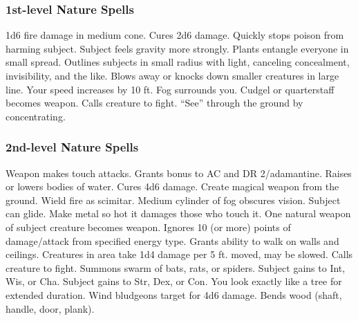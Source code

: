 \subsubsection{1st-level Nature Spells}
\begin{spelllist}
   1d6 fire damage in medium cone.
   Cures 2d6 damage.
   Quickly stops poison from harming subject.
   Subject feels gravity more strongly.
   Plants entangle everyone in small spread.
   Outlines subjects in small radius with light, canceling concealment, invisibility, and the like.
   Blows away or knocks down smaller creatures in large line.
   Your speed increases by 10 ft.
   Fog surrounds you.
   Cudgel or quarterstaff becomes  weapon.
   Calls creature to fight.
   ``See'' through the ground by concentrating.
\end{spelllist}

\subsubsection{2nd-level Nature Spells}
\begin{spelllist}
   Weapon makes touch attacks. 
   Grants  bonus to AC and DR 2/adamantine.
   Raises or lowers bodies of water.
   Cures 4d6 damage.
   Create magical weapon from the ground.
   Wield fire as scimitar.
   Medium cylinder of fog obscures vision.
   Subject can glide.
   Make metal so hot it damages those who touch it.
   One natural weapon of subject creature becomes  weapon.
   Ignores 10 (or more) points of damage/attack from specified energy type.
   Grants ability to walk on walls and ceilings.
   Creatures in area take 1d4 damage per 5 ft. moved, may be slowed.
   Calls creature to fight.
   Summons swarm of bats, rats, or spiders.
   Subject gains  to Int, Wis, or Cha.
   Subject gains  to Str, Dex, or Con.
   You look exactly like a tree for extended duration.
   Wind bludgeons target for 4d6 damage.
   Bends wood (shaft, handle, door, plank).
\end{spelllist}

